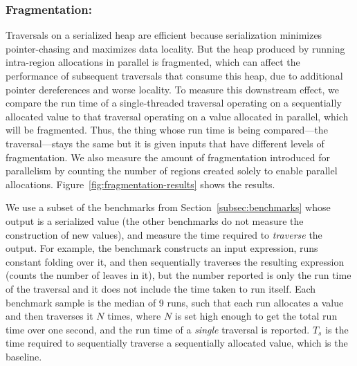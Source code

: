 \documentclass[acmsmall,acmthm=false,nonacm]{acmart}
\theoremstyle{straighttext0}
\theoremstyle{straighttext}
\newcommand{\Secref}[1]{Section~\ref{#1}}
\newcommand{\Figref}[1]{Figure~\ref{#1}}
\newcommand{\new}[1]{#1}
\begin{document}
{\subsubsection{Fragmentation:}
\label{subsec:fragmentation-results}



\new{
Traversals on a serialized heap are efficient because serialization minimizes
pointer-chasing and maximizes data locality.
%
But the heap produced by running intra-region allocations in parallel is
fragmented, which can affect the performance of subsequent traversals that
consume this heap, due to additional pointer dereferences and worse locality.
%
To measure this downstream effect,
we compare the run time of a single-threaded traversal operating
on a sequentially allocated value to that traversal
operating on a value allocated in parallel, which will be fragmented.
%
Thus, the thing whose run time is being compared---the traversal---stays the same
but it is given inputs that have different levels of fragmentation.
%
We also measure the amount of fragmentation introduced for parallelism by counting
the number of regions created solely to enable parallel allocations.
%
\Figref{fig:fragmentation-results} shows the results.

We use a subset of the benchmarks from \Secref{subsec:benchmarks}
whose output is a serialized value (the other benchmarks do not measure
the construction of new values),
and measure the time required to {\em traverse} the output.
%
For example, the benchmark \il{trav(constFold)}
constructs an input expression, runs constant folding over it,
and then sequentially traverses the resulting expression
(counts the number of leaves in it),
but the number reported is only the run time of the traversal
and it does not include the time taken to run \il{constFold} itself.
%
Each benchmark sample is the median of 9 runs,
such that each run allocates a value and then traverses it $N$ times,
where $N$ is set high enough to get the total run time over one second,
and the run time of a {\em single} traversal is reported.
%
$T_s$ is the time required to sequentially traverse a sequentially allocated
value, which is the baseline.


}}
\end{document}

